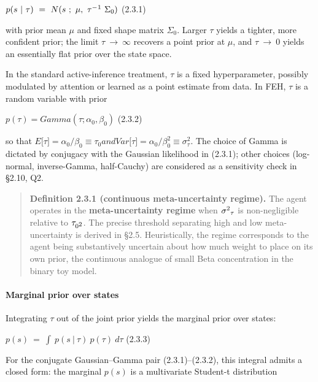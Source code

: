 \documentclass{article}
\begin{document}
\(p(s\ |\ \tau)\  = \ N(s\ ;\ \mu,\ \tau \ensuremath{^{-}}\textsuperscript{1}\ \Sigma_{0})\) (2.3.1)

with prior mean \emph{\ensuremath{\mu}} and fixed shape matrix \(\Sigma_{0}\). Larger
\(\tau\) yields a tighter, more confident prior; the limit
\(\tau\  \rightarrow \ \infty\) recovers a point prior at \(\mu\), and
\(\tau\  \rightarrow \ 0\) yields an essentially flat prior over the
state space.

In the standard active-inference treatment, \ensuremath{\tau} is a fixed hyperparameter,
possibly modulated by attention or learned as a point estimate from
data. In FEH, \ensuremath{\tau} is a random variable with prior

\(p(\tau) = Gamma\left( \tau;\alpha_{0},\beta_{0} \right)\) (2.3.2)

so that
\(E\lbrack\tau\rbrack = \alpha_{0}\text{/}\beta_{0} \equiv \tau_{0}andVar\lbrack\tau\rbrack = \alpha_{0}\text{/}\beta_{0}^{2} \equiv \sigma_{\tau}^{2}\).
The choice of Gamma is dictated by conjugacy with the Gaussian
likelihood in (2.3.1); other choices (log-normal, inverse-Gamma,
half-Cauchy) are considered as a sensitivity check in \S{}2.10, Q2.

\begin{quote}
\textbf{Definition 2.3.1 (continuous meta-uncertainty regime).} The
agent operates in the \textbf{meta-uncertainty regime} when
\({\sigma \textsuperscript{2}}_{\tau}\) is non-negligible relative to \(\tau_{0\textsuperscript{2}}\). The
precise threshold separating high and low meta-uncertainty is derived in
\S{}2.5. Heuristically, the regime corresponds to the agent being
substantively uncertain about how much weight to place on its own prior,
the continuous analogue of small Beta concentration in the binary toy
model.
\end{quote}

\paragraph{Marginal prior over states}\label{marginal-prior-over-states}

Integrating \ensuremath{\tau} out of the joint prior yields the marginal prior over
states:

\(p(s)\  = \ \int\ p(s\ |\ \tau)\ p(\tau)\ d\tau\) (2.3.3)

For the conjugate Gaussian--Gamma pair (2.3.1)--(2.3.2), this integral
admits a closed form: the marginal \(p(s)\) is a multivariate Student-t
distribution
\end{document}
